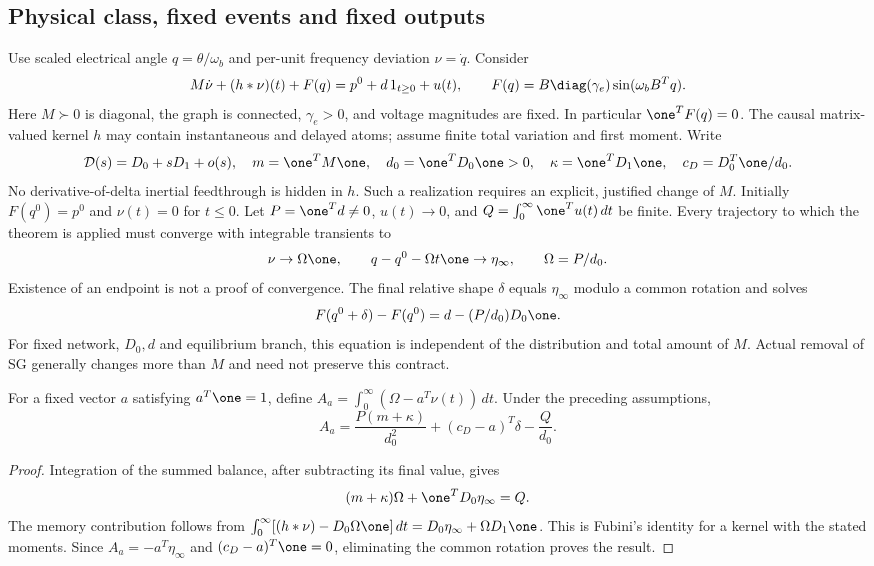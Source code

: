 \subsection{Physical class, fixed events and fixed outputs}
Use scaled electrical angle $q=\theta/\omega_b$ and per-unit frequency
deviation $\nu=\dot q$. Consider
\begin{equation}
 M\dot\nu+(h*\nu)(t)+F(q)=p^0+d\,1_{t\geq0}+u(t),\qquad
 F(q)=B\diag(\gamma_e)\sin(\omega_bB^Tq).
 \label{eq:nfl-model}
\end{equation}
Here $M\succ0$ is diagonal, the graph is connected, $\gamma_e>0$, and
voltage magnitudes are fixed. In particular $\one^TF(q)=0$.
The causal matrix-valued kernel $h$ may contain instantaneous and delayed
atoms; assume finite total variation and first moment. Write
\[
 \mathcal D(s)=D_0+sD_1+o(s),\quad
 m=\one^TM\one,\quad d_0=\one^TD_0\one>0,\quad
 \kappa=\one^TD_1\one,\quad c_D=D_0^T\one/d_0.
\]
No derivative-of-delta inertial feedthrough is hidden in $h$.
Such a realization requires an explicit, justified change of $M$.
Initially $F(q^0)=p^0$ and $\nu(t)=0$ for $t\leq0$.
Let $P=\one^Td\ne0$, $u(t)\to0$, and
$Q=\int_0^\infty\one^Tu(t)\,dt$ be finite.
Every trajectory to which the theorem is applied must converge with
integrable transients to
\[
 \nu\to\Omega\one,\qquad q-q^0-\Omega t\one\to\eta_\infty,
 \qquad \Omega=P/d_0.
\]
Existence of an endpoint is not a proof of convergence.
The final relative shape $\delta$ equals $\eta_\infty$ modulo a common
rotation and solves
\begin{equation}
 F(q^0+\delta)-F(q^0)=d-(P/d_0)D_0\one.
 \label{eq:nfl-endpoint}
\end{equation}
For fixed network, $D_0,d$ and equilibrium branch, this equation is
independent of the distribution and total amount of $M$.
Actual removal of SG generally changes more than $M$ and need not preserve
this contract.

\begin{theorem}
For a fixed vector $a$ satisfying $a^T\one=1$, define
$A_a=\int_0^\infty(\Omega-a^T\nu(t))\,dt$. Under the preceding assumptions,
\begin{equation}
 \boxed{A_a=\frac{P(m+\kappa)}{d_0^2}
              +(c_D-a)^T\delta-\frac{Q}{d_0}.}
 \label{eq:nfl-fixed-area}
\end{equation}
\end{theorem}
\begin{proof}
Integration of the summed balance, after subtracting its final value, gives
\[
 (m+\kappa)\Omega+\one^TD_0\eta_\infty=Q.
\]
The memory contribution follows from
$\int_0^\infty[(h*\nu)-D_0\Omega\one]\,dt
=D_0\eta_\infty+\Omega D_1\one$.
This is Fubini's identity for a kernel with the stated moments.
Since $A_a=-a^T\eta_\infty$ and
$(c_D-a)^T\one=0$, eliminating the common rotation proves the result.
\end{proof}

